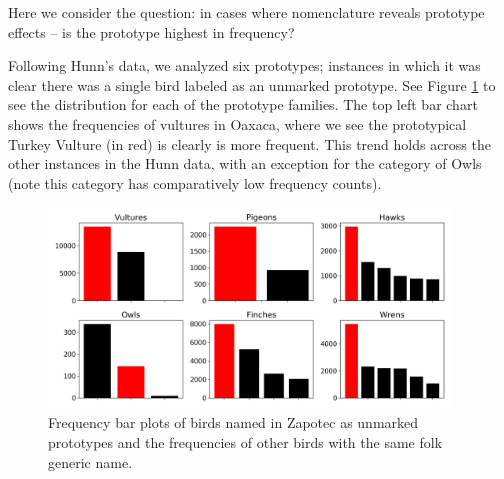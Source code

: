 \documentclass[10pt,letterpaper]{article}
\begin{document}
Here we consider the question: in cases where nomenclature reveals prototype effects -- is the prototype highest in frequency?

Following Hunn's data\cite{hunn2008zapotec}, we analyzed six prototypes; instances in which it was clear there was a single bird labeled as an unmarked prototype. See Figure \ref{fig-freq-prototype-all} to see the distribution for each of the prototype families. The top left bar chart shows the frequencies of vultures in Oaxaca, where we see the prototypical Turkey Vulture (in red) is clearly is more frequent. This trend holds across the other instances in the Hunn data, with an exception for the category of Owls (note this category has comparatively low frequency counts).







\begin{figure}[ht!]
  \begin{center}
    \includegraphics[width=0.95\textwidth]{./figures/prototypes-barplots-all.png}
        \caption{Frequency bar plots of birds named in Zapotec as unmarked prototypes and the frequencies of other birds with the same folk generic name.}
        \label{fig-freq-prototype-all}
  \end{center}
\end{figure}
\end{document}
